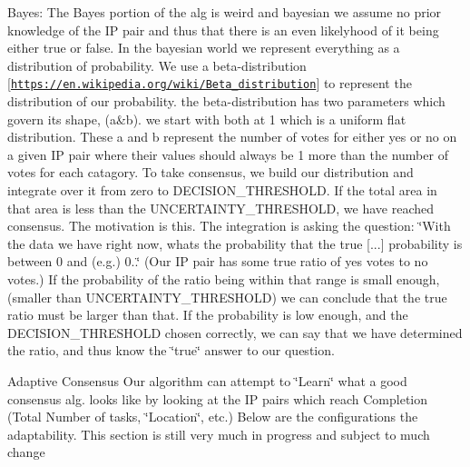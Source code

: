 Bayes\+: The Bayes portion of the alg is weird and bayesian we assume no prior knowledge of the IP pair and thus that there is an even likelyhood of it being either true or false. In the bayesian world we represent everything as a distribution of probability. We use a beta-\/distribution \mbox{[}\href{https://en.wikipedia.org/wiki/Beta_distribution}{\tt https\+://en.\+wikipedia.\+org/wiki/\+Beta\+\_\+distribution}\mbox{]} to represent the distribution of our probability. the beta-\/distribution has two parameters which govern its shape, (a\&b). we start with both at 1 which is a uniform flat distribution. These a and b represent the number of votes for either yes or no on a given IP pair where their values should always be 1 more than the number of votes for each catagory. To take consensus, we build our distribution and integrate over it from zero to D\+E\+C\+I\+S\+I\+O\+N\+\_\+\+T\+H\+R\+E\+S\+H\+O\+LD. If the total area in that area is less than the U\+N\+C\+E\+R\+T\+A\+I\+N\+T\+Y\+\_\+\+T\+H\+R\+E\+S\+H\+O\+LD, we have reached consensus. The motivation is this. The integration is asking the question\+: \char`\"{}\+With the data we have right now, what\textquotesingle{}s the probability that the true \mbox{[}...\mbox{]}
     probability is between 0 and (e.\+g.) 0..\char`\"{} (Our IP pair has some true ratio of yes votes to no votes.) If the probability of the ratio being within that range is small enough, (smaller than U\+N\+C\+E\+R\+T\+A\+I\+N\+T\+Y\+\_\+\+T\+H\+R\+E\+S\+H\+O\+LD) we can conclude that the true ratio must be larger than that. If the probability is low enough, and the D\+E\+C\+I\+S\+I\+O\+N\+\_\+\+T\+H\+R\+E\+S\+H\+O\+LD chosen correctly, we can say that we have determined the ratio, and thus know the \char`\"{}true\char`\"{} answer to our question.

Adaptive Consensus Our algorithm can attempt to \char`\"{}\+Learn\char`\"{} what a good consensus alg. looks like by looking at the IP pairs which reach Completion (Total Number of tasks, \char`\"{}\+Location\char`\"{}, etc.) Below are the configurations the adaptability. This section is still very much in progress and subject to much change 